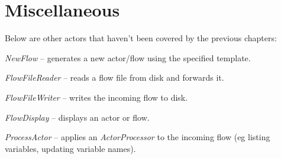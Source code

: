 \documentclass[a4paper]{book}
\begin{document}
\chapter{Miscellaneous}
Below are other actors that haven't been covered by the previous chapters:
\begin{tight_itemize}
  \item \textit{NewFlow} -- generates a new actor/flow using the specified
  template.
  \item \textit{FlowFileReader} -- reads a flow file from disk and forwards it.
  \item \textit{FlowFileWriter} -- writes the incoming flow to disk.
  \item \textit{FlowDisplay} -- displays an actor or flow.
  \item \textit{ProcessActor} -- applies an \textit{ActorProcessor} to the
  incoming flow (eg listing variables, updating variable names).
\end{tight_itemize}


\end{document}
